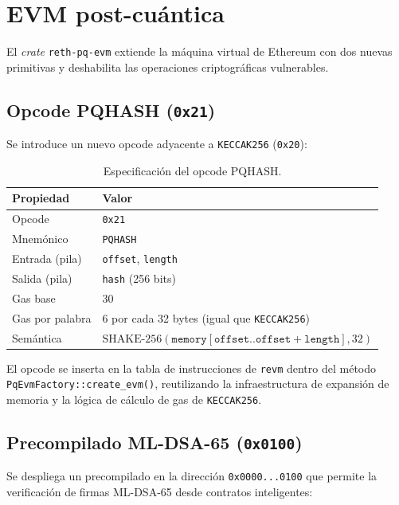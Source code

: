 \section{EVM post-cuántica}
\label{sec:dev_evm}

El \emph{crate} \texttt{reth-pq-evm} extiende la máquina virtual de Ethereum con dos nuevas primitivas y deshabilita las operaciones criptográficas vulnerables.

\subsection{Opcode PQHASH (\texttt{0x21})}
\label{sec:opcode_pqhash}

Se introduce un nuevo opcode adyacente a \texttt{KECCAK256} (\texttt{0x20}):

\begin{table}[htbp]
\centering
\caption{Especificación del opcode PQHASH.}
\label{tab:pqhash_spec}
\begin{tabular}{@{}ll@{}}
\toprule
\textbf{Propiedad} & \textbf{Valor} \\
\midrule
Opcode & \texttt{0x21} \\
Mnemónico & \texttt{PQHASH} \\
Entrada (pila) & \texttt{offset}, \texttt{length} \\
Salida (pila) & \texttt{hash} (256 bits) \\
Gas base & 30 \\
Gas por palabra & 6 por cada 32 bytes (igual que \texttt{KECCAK256}) \\
Semántica & $\text{SHAKE-256}(\texttt{memory}[\texttt{offset}..\texttt{offset}+\texttt{length}], 32)$ \\
\bottomrule
\end{tabular}
\end{table}

El opcode se inserta en la tabla de instrucciones de \texttt{revm} dentro del método \texttt{PqEvmFactory::create\_evm()}, reutilizando la infraestructura de expansión de memoria y la lógica de cálculo de gas de \texttt{KECCAK256}.

\subsection{Precompilado ML-DSA-65 (\texttt{0x0100})}
\label{sec:precompile_mldsa}

Se despliega un precompilado en la dirección \texttt{0x0000...0100} que permite la verificación de firmas ML-DSA-65 desde contratos inteligentes:

